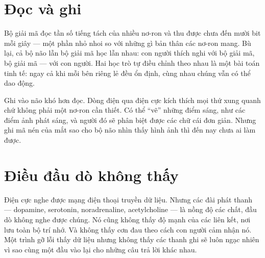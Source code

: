 \section*{Đọc và ghi}

Bộ giải mã đọc tần số tiếng tách của nhiều nơ-ron và thu được chưa đến mười bit mỗi giây --- một phần nhỏ nhoi so với những gì bản thân các nơ-ron mang. Bù lại, cả bộ não lẫn bộ giải mã học lẫn nhau: con người thích nghi với bộ giải mã, bộ giải mã --- với con người. Hai học trò tự điều chỉnh theo nhau là một bài toán tinh tế: ngay cả khi mỗi bên riêng lẻ đều ổn định, cùng nhau chúng vẫn có thể dao động.

Ghi vào não khó hơn đọc. Dòng điện qua điện cực kích thích mọi thứ xung quanh chứ không phải một nơ-ron cần thiết. Có thể ``vẽ'' những điểm sáng, như các điểm ảnh phát sáng, và người đó sẽ phân biệt được các chữ cái đơn giản. Nhưng ghi mã nén của mắt sao cho bộ não nhìn thấy hình ảnh thì đến nay chưa ai làm được.

\section*{Điều đầu dò không thấy}

Điện cực nghe được mạng điện thoại truyền dữ liệu. Nhưng các đài phát thanh --- dopamine, serotonin, noradrenaline, acetylcholine --- là nồng độ các chất, đầu dò không nghe được chúng. Nó cũng không thấy độ mạnh của các liên kết, nơi lưu toàn bộ trí nhớ. Và không thấy cơn đau theo cách con người cảm nhận nó. Một trình gỡ lỗi thấy dữ liệu nhưng không thấy các thanh ghi sẽ luôn ngạc nhiên vì sao cùng một đầu vào lại cho những câu trả lời khác nhau.


